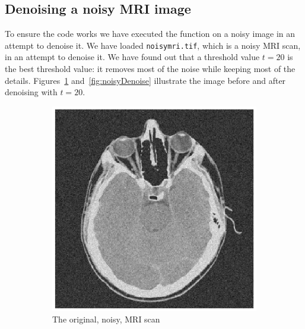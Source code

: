 \subsection{Denoising a noisy MRI image}
To ensure the code works we have executed the function on a noisy image in an attempt to denoise it. We have loaded \texttt{noisymri.tif}, which is a noisy MRI scan, in an attempt to denoise it. We have found out that a threshold value $t = 20$ is the best threshold value: it removes most of the noise while keeping most of the details. Figures~\ref{fig:noisyOrig} and~\ref{fig:noisyDenoise} illustrate the image before and after denoising with $t = 20$.
\begin{figure}[htb]
\centering
\begin{subfigure}{.5\textwidth}
  \centering
  \includegraphics[scale=.7]{noisyMRI.eps}
  \caption{The original, noisy, MRI scan\newline}
  \label{fig:noisyOrig}
\end{subfigure}%
\centering
\begin{subfigure}{.5\textwidth}
  \centering

\end{subfigure}
\end{figure}
